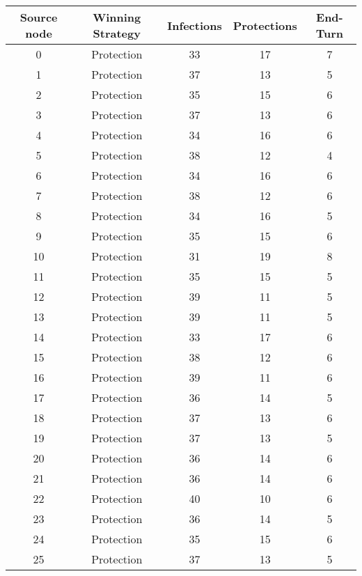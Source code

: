 \documentclass[results.tex]{subfiles}
\begin{document}
\begin{center}
  \begin{tabular}{| c || c | c | c | c |}
    \hline
    {\bfseries Source node} & {\bfseries Winning Strategy} & {\bfseries Infections} & {\bfseries Protections} & {\bfseries End-Turn} \\  %
    \hline\hline
    0 & Protection & 33 & 17 & 7 \\ 
    \hline
    1 & Protection & 37 & 13 & 5 \\ 
    \hline
    2 & Protection & 35 & 15 & 6 \\ 
    \hline
    3 & Protection & 37 & 13 & 6 \\ 
    \hline
    4 & Protection & 34 & 16 & 6 \\ 
    \hline
    5 & Protection & 38 & 12 & 4 \\ 
    \hline
    6 & Protection & 34 & 16 & 6 \\ 
    \hline
    7 & Protection & 38 & 12 & 6 \\ 
    \hline
    8 & Protection & 34 & 16 & 5 \\ 
    \hline
    9 & Protection & 35 & 15 & 6 \\ 
    \hline
    10 & Protection & 31 & 19 & 8 \\ 
    \hline
    11 & Protection & 35 & 15 & 5 \\ 
    \hline
    12 & Protection & 39 & 11 & 5 \\ 
    \hline
    13 & Protection & 39 & 11 & 5 \\ 
    \hline
    14 & Protection & 33 & 17 & 6 \\ 
    \hline
    15 & Protection & 38 & 12 & 6 \\ 
    \hline
    16 & Protection & 39 & 11 & 6 \\ 
    \hline
    17 & Protection & 36 & 14 & 5 \\ 
    \hline
    18 & Protection & 37 & 13 & 6 \\ 
    \hline
    19 & Protection & 37 & 13 & 5 \\ 
    \hline
    20 & Protection & 36 & 14 & 6 \\ 
    \hline
    21 & Protection & 36 & 14 & 6 \\ 
    \hline
    22 & Protection & 40 & 10 & 6 \\ 
    \hline
    23 & Protection & 36 & 14 & 5 \\ 
    \hline
    24 & Protection & 35 & 15 & 6 \\ 
    \hline
    25 & Protection & 37 & 13 & 5 \\ 

\end{tabular}
\end{center}
\end{document}
